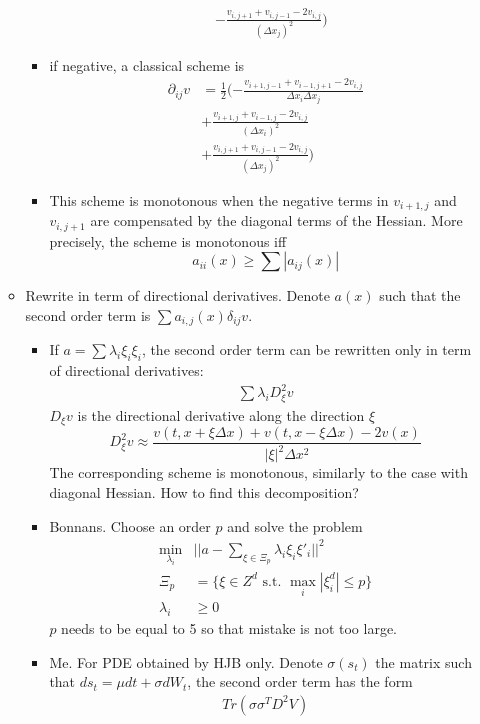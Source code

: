 \documentclass[english]{article}
\begin{document}
\begin{itemize}
\begin{itemize}
\begin{itemize}
\begin{align*}
				&-  \frac{v_{i, j+1} + v_{i, j-1}- 2v_{i,j}}{(\Delta x_j)^2})
			\end{align*}
			\item if negative, a classical scheme is
			\begin{align*}
				\partial_{ij}v&= \frac{1}{2}(-\frac{v_{i+1, j-1} + v_{i-1, j+1}- 2v_{i,j}}{\Delta x_i \Delta x_j} \\
				&+  \frac{v_{i+1, j} + v_{i-1, j}- 2v_{i,j}}{(\Delta x_i)^2}\\
				&+  \frac{v_{i, j+1} + v_{i, j-1}- 2v_{i,j}}{(\Delta x_j)^2})
			\end{align*}
			\item This scheme is monotonous when the negative terms in $v_{i+1, j}$ and $v_{i, j+1}$ are compensated by the diagonal terms of the Hessian. More precisely, the scheme is monotonous iff 		$$a_{ii}(x) \geq \sum |a_{ij}(x)|$$
		\end{itemize}
		\item Rewrite in term of directional derivatives. Denote $a(x)$ such that the second order term is $\sum a_{i, j}(x) \delta_{ij} v$.
		\begin{itemize}
			\item If  $a = \sum \lambda_i \xi_i \xi_i$, the second order term can be rewritten only in term of directional derivatives:
			\begin{align*}
				\sum \lambda_i D_\xi^2v
			\end{align*}
			$D_\xi v$ is the directional derivative along the direction $\xi$
			$$D^2_\xi v \approx \frac{v(t, x+\xi \Delta x) + v(t, x-\xi \Delta x) - 2 v(x)}{|\xi|^2 \Delta x^2}$$
			The corresponding scheme is monotonous, similarly to the case with diagonal Hessian. 
			How to find this decomposition?
			\item 
			Bonnans. Choose an order $p$ and solve the problem 
			\begin{align*}
				\min_{\lambda_i}&||a - \sum_{\xi \in \Xi_p} \lambda_i \xi_i \xi'_i||^2\\
				\Xi_p &= \{\xi \in Z^d \text{ s.t. }  \max_i|\xi_i^d| \leq p \}\\
				\lambda_i &\geq 0
			\end{align*}
			$p$ needs to be equal to 5 so that mistake is not too large.
			\item Me. For PDE obtained by HJB only. Denote $\sigma(s_t)$ the matrix such that $ds_t = \mu dt + \sigma dW_t$, the second order term has the form 
			\begin{align*}
				Tr(\sigma\sigma^TD^2V)

\end{align*}
\end{itemize}
\end{itemize}
\end{itemize}
\end{document}
